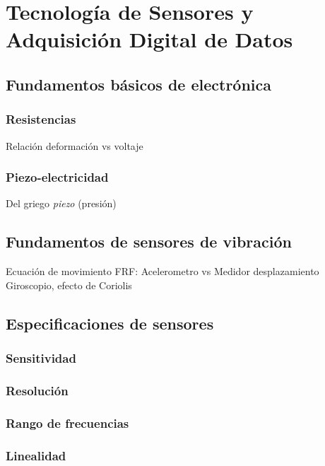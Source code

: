 \chapter{Tecnología de Sensores y Adquisición Digital de Datos}

\section{Fundamentos básicos de electrónica}

\subsection{Resistencias}

Relación deformación vs voltaje

\subsection{Piezo-electricidad}

Del griego \emph{piezo} (presión)

\section{Fundamentos de sensores de vibración}

Ecuación de movimiento
FRF: Acelerometro vs Medidor desplazamiento
Giroscopio, efecto de Coriolis

\section{Especificaciones de sensores}

\subsection{Sensitividad}

\subsection{Resolución}

\subsection{Rango de frecuencias}

\subsection{Linealidad}

